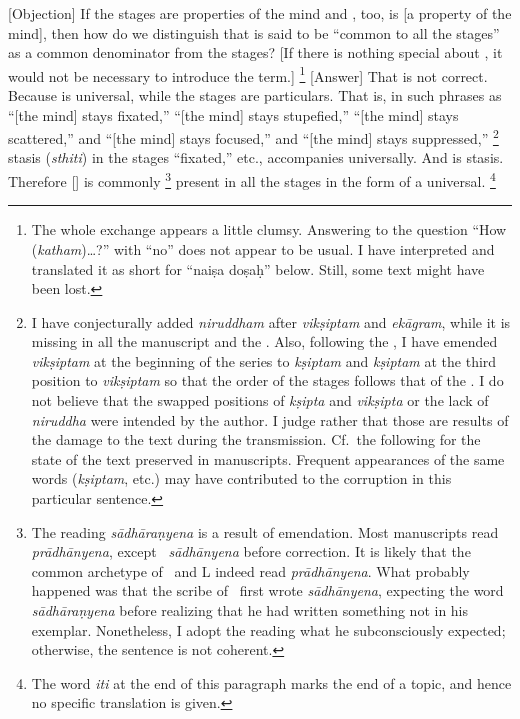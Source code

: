[Objection]%
 If the stages are properties of the mind and \samadhi, too, is [a property of the mind], then how do we distinguish \samadhi\/ that is said to be ``common to all the stages'' as a common denominator from the stages?  [If there is nothing special about \samadhi, it would not be necessary to introduce the term.]%
     \footnote{The whole exchange appears a little clumsy.  Answering to the question ``How (\emph{ka\-tha\-m})\ldots?'' with ``no'' does not appear to be usual.  I have interpreted and translated it as short for ``naiṣa doṣaḥ'' below.  Still, some text might have been lost.%
     }
%
[Answer] That is not correct.  Because \samadhi\/ is
universal, while the stages are particulars.  That is, in such phrases as ``[the mind] stays fixated,'' ``[the mind] stays stupefied,'' ``[the mind] stays scattered,'' and ``[the mind] stays focused,'' and ``[the mind] stays suppressed,''%
  \footnote{I have conjecturally added \emph{niruddham} after \emph{vikṣiptam} and \emph{ekāgram}, while it is missing in all the manuscript and the \EP.  Also, following the \EP, I have emended \emph{vikṣiptam} at the beginning of the series to \emph{kṣiptam} and \emph{kṣiptam} at the third position to \emph{vikṣiptam} so that the order of the stages follows that of the \bhasya.  I do not believe that the swapped positions of \emph{kṣipta} and \emph{vikṣipta} or the lack of \emph{niruddha} were intended by the author.  I judge rather that those are results of the damage to the text during the transmission.  Cf.\ the following for the state of the text preserved in manuscripts.  Frequent appearances of the same words (\emph{kṣiptam}, etc.) may have contributed to the corruption in this particular sentence.%
  } %
stasis (\emph{sthiti}) in the stages ``fixated,'' etc., accompanies universally.  And \samadhi\/ is stasis.  Therefore [\samadhi] is commonly%
  \footnote{The reading \emph{sā\-dhā\-ra\-ṇye\-na} is a result of emendation.  Most manuscripts read \emph{prā\-dhā\-nye\-na}, except \Tm\ \emph{sā\-dhā\-nye\-na} before correction.  It is likely that the common archetype of \Tm\ and L indeed read \emph{prā\-dhā\-nye\-na}.  What probably happened was that the scribe of \Tm\ first wrote \emph{sā\-dhā\-nye\-na}, expecting the word \emph{sā\-dhā\-ra\-ṇye\-na} before realizing that he had written something not in his exemplar.  Nonetheless, I adopt the reading what he subconsciously expected; otherwise, the sentence is not coherent.%
  } %
present in all the stages in the form of a universal.%
  \footnote{The word \emph{iti} at the end of this paragraph marks the end of a topic, and hence no specific translation is given.%
  }

